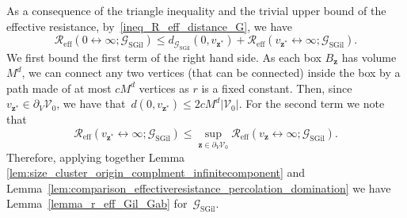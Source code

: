 \documentclass[a4paper,11pt]{article}
\theoremstyle{definition}
\begin{document}
As a consequence of the triangle inequality and the trivial upper bound of the effective resistance, by~\eqref{ineq_R_eff_distance_G}, we have
$$ \mathcal R_\mathrm{eff}(0 \longleftrightarrow \infty; \mathcal G_\mathrm{SGil}) \le d_{\mathcal G_\mathrm{SGil}}(0,v_{\mathbf z^\ast}) + \mathcal R_\mathrm{eff}(v_{\mathbf z^\ast}\longleftrightarrow \infty; \mathcal G_\mathrm{SGil}). $$
We first bound the first term of the right hand side. As each box $B_\mathbf z$ has volume $M^d$, we can connect any two vertices (that can be connected) inside the box by a path made of at most $cM^d$ vertices as $r$ is a fixed constant. Then, since~$v_{\mathbf{z}^\ast} \in \partial_V \mathcal V_0 $, we have that~$d(0,v_{\mathbf z^\ast})\le 2cM^d|\mathcal V_0|$. For the second term we note that  
$$ \mathcal R_\mathrm{eff}(v_{\mathbf z^\ast}\longleftrightarrow \infty; \mathcal G_\mathrm{SGil}) \leq \sup_{\mathbf z \in \partial_V \mathcal V_0} \mathcal R_\mathrm{eff}(v_{\mathbf z}\longleftrightarrow \infty; \mathcal G_\mathrm{SGil}).$$
Therefore, applying together Lemma \ref{lem:size_cluster_origin_complment_infinitecomponent} and Lemma~\ref{lem:comparison_effectiveresistance_percolation_domination} we have Lemma~\ref{lemma_r_eff_Gil_Gab} for~$\mathcal G_\mathrm{SGil}$.

    
\end{document}
